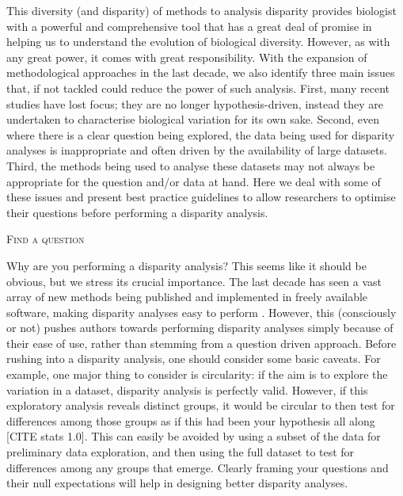 \documentclass[12pt,letterpaper]{article}
\renewcommand{\section}[1]{%
\bigskip
\begin{center}
\begin{Large}
\normalfont\scshape #1
\medskip
\end{Large}
\end{center}}
\begin{document}
This diversity (and disparity) of methods to analysis disparity provides biologist with a powerful and comprehensive tool %
that has a great deal of promise in helping us to understand the evolution of biological diversity.
However, as with any great power, it comes with great responsibility. 
With the expansion of methodological approaches in the last decade, we also identify three main issues that, if not tackled could reduce the power of such analysis.
First, many recent studies have lost focus; they are no longer hypothesis-driven, instead they are undertaken to characterise biological variation for its own sake.
Second, even where there is a clear question being explored, the data being used for disparity analyses is inappropriate and often driven by the availability of large datasets.
Third, the methods being used to analyse these datasets may not always be appropriate for the question and/or data at hand.
Here we deal with some of these issues and present best practice guidelines to allow researchers to optimise their questions before performing a disparity analysis.

\section{Find a question} %
Why are you performing a disparity analysis?
This seems like it should be obvious, but we stress its crucial importance.
The last decade has seen a vast array of new methods being published and implemented in freely available software, making disparity analyses easy to perform \citep{bouxin2005ginkgo,oksanen2007vegan,geiger2008,zelditch2012geometric,adams2013geomorph,Claddis,dispRityv02,adams2017geometric}.
However, this (consciously or not) pushes authors towards performing disparity analyses simply because of their ease of use, rather than stemming from a question driven approach.
Before rushing into a disparity analysis, one should consider some basic caveats.
For example, one major thing to consider is circularity: if the aim is to explore the variation in a dataset, disparity analysis is perfectly valid.
However, if this exploratory analysis reveals distinct groups, it would be circular to then test for differences among those groups as if this had been your hypothesis all along [CITE stats 1.0].
This can easily be avoided by using a subset of the data for preliminary data exploration, and then using the full dataset to test for differences among any groups that emerge.
Clearly framing your questions and their null expectations will help in designing better disparity analyses.
\end{document}
